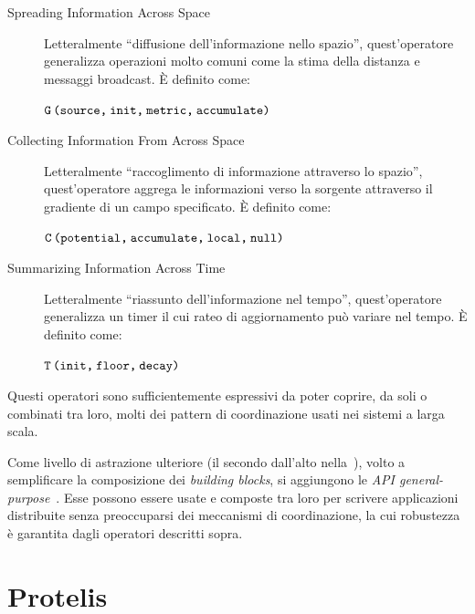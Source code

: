\begin{description}
  \item[Spreading Information Across Space]
    Letteralmente \enquote{diffusione dell'informazione nello spazio},
    quest'operatore generalizza operazioni molto comuni come la stima della distanza e messaggi broadcast.
    È definito come:

    \(\texttt{G\,(source,\:init,\:metric,\:accumulate)}\)

  \item[Collecting Information From Across Space]
    Letteralmente \enquote{raccoglimento di informazione attraverso lo spazio},
    quest'operatore aggrega le informazioni verso la sorgente attraverso il gradiente di un campo specificato.
    È definito come:

    \(\texttt{C\,(potential,\:accumulate,\:local,\:null)}\)

  \item[Summarizing Information Across Time]
    Letteralmente \enquote{riassunto dell'informazione nel tempo},
    quest'operatore generalizza un timer il cui rateo di aggiornamento può variare nel tempo.
    È definito come:

    \(\texttt{T\,(init,\:floor,\:decay)}\)
\end{description}

Questi operatori sono sufficientemente espressivi da poter coprire, da soli o combinati tra loro, molti dei pattern di coordinazione usati nei sistemi a larga scala.

Come livello di astrazione ulteriore (il secondo dall'alto nella~), volto a semplificare la composizione dei \emph{building blocks}, si aggiungono le \emph{API general-purpose}~\cite{amslaurea13090}.
Esse possono essere usate e composte tra loro per scrivere applicazioni distribuite senza preoccuparsi dei meccanismi di coordinazione, la cui robustezza è garantita dagli operatori descritti sopra.

\section{Protelis}\label{sec:protelis}


